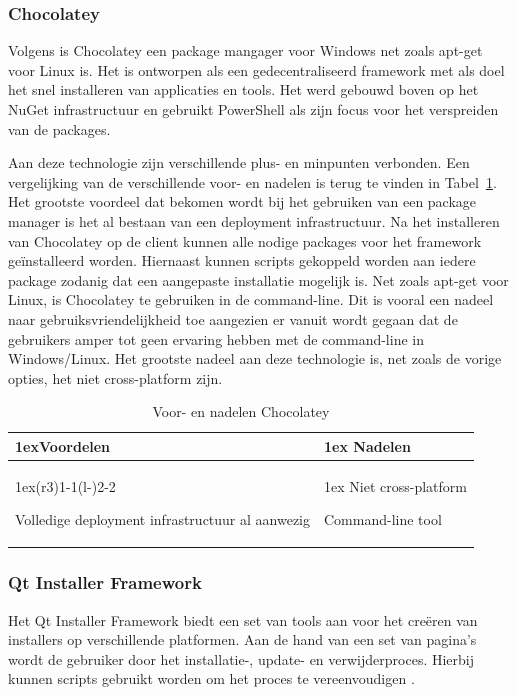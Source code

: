\subsubsection{Chocolatey}
Volgens \citet{chocoAbout} is Chocolatey een package mangager voor Windows net zoals apt-get voor Linux is.
Het is ontworpen als een gedecentraliseerd framework met als doel het snel installeren van applicaties en tools.
Het werd gebouwd boven op het NuGet infrastructuur en gebruikt PowerShell als zijn focus voor het verspreiden van de packages.

Aan deze technologie zijn verschillende plus- en minpunten verbonden.
Een vergelijking van de verschillende voor- en nadelen is terug te vinden in Tabel~\ref{tab:choco}.
Het grootste voordeel dat bekomen wordt bij het gebruiken van een package manager is het al bestaan van een deployment infrastructuur. 
Na het installeren van Chocolatey op de client kunnen alle nodige packages voor het framework geïnstalleerd worden.
Hiernaast kunnen scripts gekoppeld worden aan iedere package zodanig dat een aangepaste installatie mogelijk is.
Net zoals apt-get voor Linux, is Chocolatey te gebruiken in de command-line.
Dit is vooral een nadeel naar gebruiksvriendelijkheid toe aangezien er vanuit wordt gegaan dat de gebruikers amper tot geen ervaring hebben met de command-line in Windows/Linux.
Het grootste nadeel aan deze technologie is, net zoals de vorige opties, het niet cross-platform zijn.

\begin{table}
\begin{tabularx}{\linewidth}{>{\parskip1ex}X@{\kern4\tabcolsep}>{\parskip1ex}X}
\toprule
\hfil\bfseries Voordelen
&
\hfil\bfseries Nadelen
\\\cmidrule(r{3\tabcolsep}){1-1}\cmidrule(l{-\tabcolsep}){2-2}

Volledige deployment infrastructuur al aanwezig\par
&
Niet cross-platform\par 
Command-line tool
\\\bottomrule
\end{tabularx}
\caption{Voor- en nadelen Chocolatey}
\label{tab:choco}
\end{table}

\subsubsection{Qt Installer Framework}
Het Qt Installer Framework biedt een set van tools aan voor het creëren van installers op verschillende platformen.
Aan de hand van een set van pagina's wordt de gebruiker door het installatie-, update- en verwijderproces.
Hierbij kunnen scripts gebruikt worden om het proces te vereenvoudigen \citep{qtDoc}.

